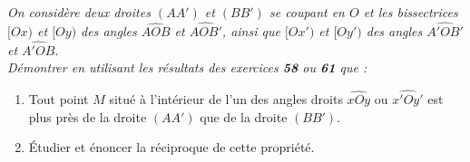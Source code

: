 \begin{itemize}
\it On considère deux droites $(AA')$ et $(BB')$ se coupant en $O$ et les bissectrices $[Ox)$ et $[Oy)$ des angles $\widehat{AOB}$ et $\widehat{AOB'}$, ainsi que $[Ox')$ et $[Oy')$ des angles $\widehat{A'OB'}$ et $\widehat{A'OB}$.
\\ Démontrer en utilisant les résultats des exercices \textbf{58} ou \textbf{61} que : 
\begin{enumerate}
\item Tout point $M$ situé à l'intérieur de l'un des angles droits $\widehat{xOy}$ ou $\widehat{x'Oy'}$ est plus près de la droite $(AA')$ que de la droite $(BB')$.
\item Étudier et énoncer la réciproque de cette propriété.
\end{enumerate}
\end{itemize}